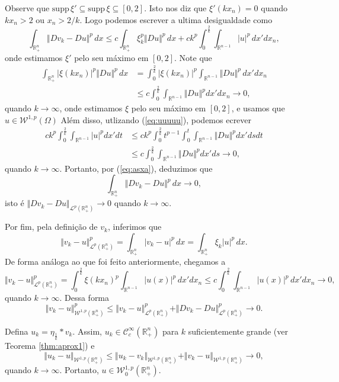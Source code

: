 \documentclass[a4paper, 11pt]{book}
\theoremstyle{definition}
\newcommand{\bR}{\mathbb{R}}
\newcommand{\cC}{\mathcal{C}}
\newcommand{\cL}{\mathcal{L}}
\newcommand{\cW}{\mathcal{W}}
\newcommand{\supp}{\mathrm{supp}\,}
\begin{document}
\begin{prf}
\begin{equation}
    \end{equation}
    Observe que $\supp \xi' \subseteq \supp \xi \subseteq [0,2]$. Isto nos diz que $\xi'(kx_n) = 0$ quando $kx_n > 2$ ou $x_n > 2/k$.
    Logo podemos escrever a ultima desigualdade como
    \[
        \int_{\bR^n_+} \Vert Dv_k - Du \Vert^p \,dx \leqslant c \int_{\bR^{n}_+} \xi_k^p \Vert Du \Vert^p \,dx + ck^p \int_{0}^{\frac{2}{k}} \int_{\bR^{n-1}} |u|^p \,dx'dx_n,
    \]
    onde estimamos $\xi'$ pelo seu máximo em $[0,2]$.
    Note que
    \[
        \begin{aligned}
            \int_{\bR^{n}_+} |\xi(kx_n)|^p \Vert Du \Vert^p \,dx &= \int_{0}^{\frac{2}{k}} |\xi(kx_n)|^p \int_{\bR^{n-1}} \Vert Du \Vert^p \,dx' dx_n\\
            &\leqslant c \int_{0}^{\frac{2}{k}} \int_{\bR^{n-1}} \Vert Du \Vert^p dx' dx_n \longrightarrow 0,
        \end{aligned}
    \]
    quando $k \to \infty$, onde estimamos $\xi$ pelo seu máximo em $[0,2]$, e usamos que $u \in \cW^{1,p}(\Omega)$ 
    Além disso, utlizando (\ref{eq:uuuuu}), podemos ecrever
    \[
        \begin{aligned}
            ck^p \int_{0}^{\frac{2}{k}} \int_{\bR^{n-1}} |u|^p dx'dt &\leqslant ck^p \int_{0}^{\frac{2}{k}} t^{p-1} \int_{0}^{t} \int_{\bR^{n-1}} \Vert Du \Vert^p dx'ds dt\\ 
            &\leqslant c \int_0^{\frac{2}{k}} \int_{\bR^{n-1}} \Vert Du \Vert^p dx'ds \to 0,
        \end{aligned}
    \]
    quando $k \to \infty$.
    Portanto, por (\ref{eq:asxa}), deduzimos que
    \[
        \int_{\bR^n_+} \Vert Dv_k - Du \Vert^p \,dx \to 0,
    \]
    isto é $\Vert Dv_k - Du \Vert_{\cL^p(\bR^n_+)} \to 0$ quando $k \to \infty$.

    Por fim, pela definição de $v_k$, inferimos que
    \[
        \Vert v_k - u \Vert_{\cL^p(\bR^n_+)}^p = \int_{\bR^n_+} |v_k - u|^p \,dx = \int_{\bR^n_+} \xi_k|u|^p \,dx.
    \]
    De forma análoga ao que foi feito anteriormente, chegamos a
    \[
        \Vert v_k - u \Vert_{\cL^p(\bR^n_+)}^p = \int_{0}^{\frac{2}{k}} \xi(kx_n)^p \int_{\bR^{n-1}} |u(x)|^p \,dx'dx_n \leqslant c \int_{0}^{\frac{2}{k}} \int_{\bR^{n-1}} |u(x)|^p \, dx'dx_n \to 0,
    \]
    quando $k \to \infty$. Dessa forma
    \[
        \Vert v_k - u \Vert_{\cW^{1,p}(\bR^n_+)}^p \leqslant \Vert v_k - u \Vert_{\cL^{p}(\bR^n_+)}^p + \Vert Dv_k - Du \Vert_{\cL^{p}(\bR^n_+)}^p \to 0.
    \]

    Defina $u_k = \eta_{\frac{1}{k}} * v_k$. Assim, $u_k \in \cC^{\infty}_c(\bR^n_+)$ para $k$ suficientemente grande (ver Teorema \ref{thm:aprox1}) e 
    \[
        \Vert u_k - u \Vert_{\cW^{1,p}(\bR^n_+)} \leqslant \Vert u_k - v_k \Vert_{\cW^{1,p}(\bR^n_+)} + \Vert v_k - u \Vert_{\cW^{1,p}(\bR^n_+)} \to 0,
    \]
    quando $k \to \infty$.
    Portanto, $u \in \cW^{1,p}_0(\bR^n_+)$.
\end{prf}
\end{document}
